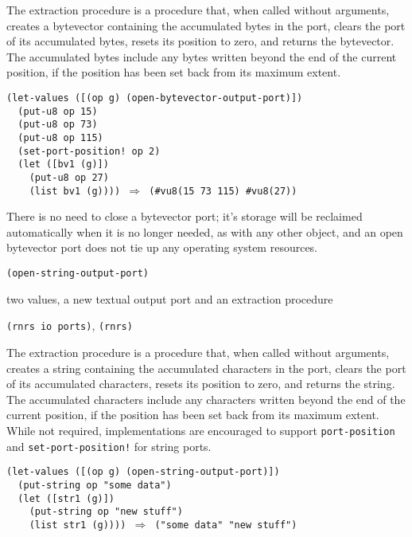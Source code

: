The extraction procedure is a procedure that, when called without
arguments, creates a bytevector containing the accumulated bytes in the
port, clears the port of its accumulated bytes, resets its position to
zero, and returns the bytevector.
The accumulated bytes include any bytes written beyond the end of
the current position, if the position has been set back from its
maximum extent.


\begin{alltt}
(let-values ([(op g) (open-bytevector-output-port)])
  (put-u8 op 15)
  (put-u8 op 73)
  (put-u8 op 115)
  (set-port-position! op 2)
  (let ([bv1 (g)])
    (put-u8 op 27)
    (list bv1 (g)))) \(\Rightarrow\) (\#{}vu8(15 73 115) \#{}vu8(27))
\end{alltt}


There is no need to close a bytevector port; it's storage will be reclaimed
automatically when it is no longer needed, as with any other object, and
an open bytevector port does not tie up any operating system resources.


\begin{description}

\label{io_s37}\item[procedure] \texttt{(open-string-output-port)}



\item[returns] two values, a new textual output port and an extraction procedure


\item[libraries] \texttt{(rnrs io ports)}, \texttt{(rnrs)}
\end{description}


The extraction procedure is a procedure that, when called without
arguments, creates a string containing the accumulated characters in the
port, clears the port of its accumulated characters, resets its position to
zero, and returns the string.
The accumulated characters include any characters written beyond the end of
the current position, if the position has been set back from its
maximum extent.
While not required, implementations are encouraged to support \texttt{port-position}
and \texttt{set-port-position!} for string ports.


\begin{alltt}
(let-values ([(op g) (open-string-output-port)])
  (put-string op "some data")
  (let ([str1 (g)])
    (put-string op "new stuff")
    (list str1 (g)))) \(\Rightarrow\) ("some data" "new stuff")
\end{alltt}



